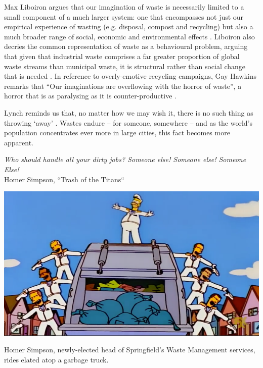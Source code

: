 \documentclass[nofonts,nols,justified,nobib]{tufte-book}
\begin{document}

Max Liboiron argues that our imagination of waste is necessarily limited to a small component of a much larger system: one that encompasses not just our empirical experience of wasting (e.g. disposal, compost and recycling) but also a much broader range of social, economic and environmental effects \cite{liboiron_mapping_2014, liboiron_why_2014}. Liboiron also decries the common representation of waste as a behavioural problem, arguing that given that industrial waste comprises a far greater proportion of global waste streams than municipal waste, it is structural rather than social change that is needed \cite{liboiron_against_2014}. In reference to overly-emotive recycling campaigns, Gay Hawkins remarks that ``Our imaginations are overflowing with the horror of waste'', a horror that is as paralysing as it is counter-productive \cite{hawkins_ethics_2006}.

Lynch reminds us that, no matter how we may wish it, there is no such thing as throwing `away' \cite{lynch_wasting_1990}. Wastes endure -- for someone, somewhere -- and as the world's population concentrates ever more in large cities, this fact becomes more apparent. 

\begin{flushright}
\begin{flushright}
\emph{Who should handle all your dirty jobs? Someone else! Someone else! Someone Else!} \cite{reardon_trash_1998}\\
Homer Simpson, ``Trash of the Titans``
\end{flushright}
\end{flushright}

\begin{marginfigure}
\includegraphics[width=\textwidth]{img/1/simpson-truck.png}
\caption{Homer Simpson, newly-elected head of Springfield's Waste Management services, rides elated atop a garbage truck.\label{b} \cite{reardon_trash_1998} }
\end{marginfigure}
\end{document}
